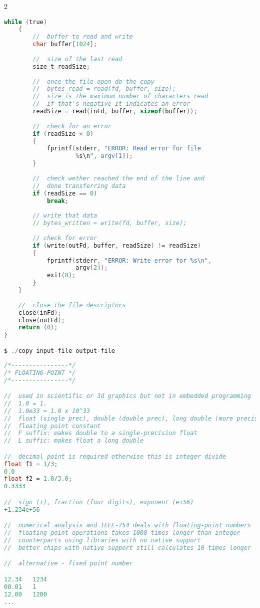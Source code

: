 \documentclass[8pt]{extarticle}
\begin{document}
\begin{small}
\begin{multicols}{2}
\begin{lstlisting}[language=C]
	while (true)
	{
		//  buffer to read and write
		char buffer[1024];
		
		//  size of the last read
		size_t readSize;
		
		//  once the file open do the copy
		//  bytes_read = read(fd, buffer, size);
		//  size is the maximum number of characters read
		//  if that's negative it indicates an error
		readSize = read(inFd, buffer, sizeof(buffer));
		
		//  check for an error
		if (readSize < 0)
		{
			fprintf(stderr, "ERROR: Read error for file 
					%s\n", argv[1]);
		}
		
		//  check wether reached the end of the line and
		//  done transferring data
		if (readSize == 0)
			break;
			
		// write that data
		// bytes_written = write(fd, buffer, size);
		
		// check for error
		if (write(outFd, buffer, readSize) != readSize)
		{
			fprintf(stderr, "ERROR: Write error for %s\n", 
					argv[2]);
			exit(8);
		}
	}
	
	//  close the file descriptors
	close(inFd);
	close(outFd);
	return (0);
}

$ ./copy input-file output-file
\end{lstlisting}

\begin{lstlisting}[language=C]
/*----------------*/
/* FLOATING-POINT */
/*----------------*/

//  used in scientific or 3d graphics but not in embedded programming
//  1.0 = 1.
//  1.0e33 = 1.0 x 10^33
//  float (single prec), double (double prec), long double (more precise)
//  floating point constant
//  F suffix: makes double to a single-precision float
//  L suffic: makes float a long double

//  decimal point is required otherwise this is integer divide
float f1 = 1/3;
0.0
float f2 = 1.0/3.0;
0.3333

//  sign (+), fraction (four digits), exponent (e+56)
+1.234e+56

//  numerical analysis and IEEE-754 deals with floating-point numbers
//  floating point operations takes 1000 times longer than integer 
//	counterparts using libraries with no native support
//	better chips with native support still calculates 10 times longer

//  alternative - fixed point number

12.34	1234
00.01	1
12.00	1200
...
\end{lstlisting}


\end{multicols}
\end{small}
\end{document}
